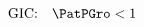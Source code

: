 \begin{equation}\begin{gathered}\begin{split}
    \text{GIC:}  &&  \PatPGro  < 1 \phantom{/\PGro}&  \label{eq:GICRaw}
\end{split}\end{gathered}\end{equation}
